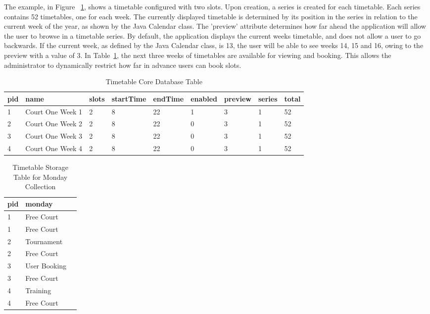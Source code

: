 The example, in Figure ~\ref{fig:ttdb}, shows a timetable configured with two slots. Upon creation, a series is created for each timetable. Each series contains 52 timetables, one for each week. The currently displayed timetable is determined by its position in the series in relation to the current week of the year, as shown by the Java Calendar class. The 'preview' attribute determines how far ahead the application will allow the user to browse in a timetable series. By default, the application displays the current weeks timetable, and does not allow a user to go backwards. If the current week, as defined by the Java Calendar class, is 13, the user will be able to see weeks 14, 15 and 16, owing to the preview with a value of 3. In Table~\ref{fig:ttdb}, the next three weeks of timetables are available for viewing and booking. This allows the administrator to dynamically restrict how far in advance users can book slots.

\begin{table}[H]
	\caption{Timetable Core Database Table}
    \begin{tabular}{| l | l | l | l | l | l | l | l | p{.8cm} |}
    \hline
    pid & name & slots & startTime & endTime & enabled & preview & series & total\\ \hline
    1 & Court One Week 1 & 2 & 8 & 22 & 1 & 3 & 1 & 52\\ \hline
	2 & Court One Week 2 & 2 & 8 & 22 & 0 & 3 & 1 & 52\\ \hline
	3 & Court One Week 3 & 2 & 8 & 22 & 0 & 3 & 1 & 52\\ \hline
	4 & Court One Week 4 & 2 & 8 & 22 & 0 & 3 & 1 & 52\\ \hline
    \end{tabular}

	\label{fig:ttdb}
\end{table}

\begin{table}
	\caption{Timetable Storage Table for Monday Collection}
\begin {center}
    \begin{tabular}{| l | l | p{.8cm} |}
	\hline
	pid & monday \\ \hline
	1 & Free Court \\ \hline
	1 & Free Court \\ \hline
	2 & Tournament \\ \hline
	2 & Free Court \\ \hline
	3 & User Booking \\ \hline
	3 & Free Court \\ \hline
	4 & Training \\ \hline
	4 & Free Court \\ \hline
	\end{tabular}
	\end{center}
\end{table}

